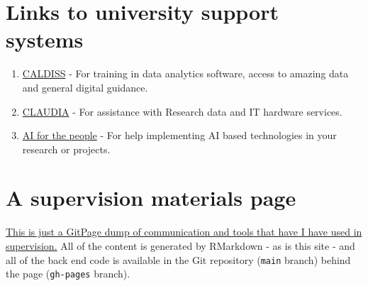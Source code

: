 \documentclass[
]{book}
\begin{document}
\hypertarget{links-to-university-support-systems}{%
\section{Links to university support systems}\label{links-to-university-support-systems}}

\begin{enumerate}
\def\labelenumi{\arabic{enumi}.}
\item
  \href{https://www.en.caldiss.aau.dk}{CALDISS} - For training in data analytics software, access to amazing data and general digital guidance.
\item
  \href{https://www.claaudia.aau.dk}{CLAUDIA} - For assistance with Research data and IT hardware services.
\item
  \href{https://www.ai.aau.dk}{AI for the people} - For help implementing AI based technologies in your research or projects.
\end{enumerate}

\hypertarget{a-supervision-materials-page}{%
\section{A supervision materials page}\label{a-supervision-materials-page}}

\href{https://robabsmith.github.io/supervision_gitpage/}{This is just a GitPage dump of communication and tools that have I have used in supervision.} All of the content is generated by RMarkdown - as is this site - and all of the back end code is available in the Git repository (\texttt{main} branch) behind the page (\texttt{gh-pages} branch).

  
\end{document}

